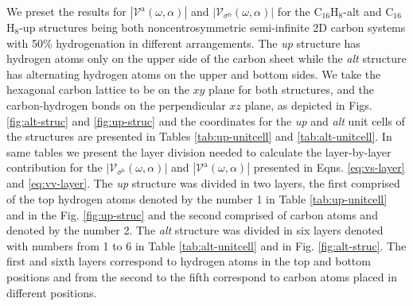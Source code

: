 \documentclass[prb,11pt,tightenlines,twocolumn,aps]{revtex4-1}
\begin{document}
We preset the results for $|\mathcal{V}^{\mathrm{a}}(\omega,\alpha)|$ and
$|\mathcal{V}_{\sigma^{\mathrm{b}}}(\omega,\alpha)|$ for the C$_{16}$H$_{8}$-alt
and C$_{16}$H$_{8}$-up structures being both noncentrosymmetric semi-infinite 2D
carbon systems with 50\% hydrogenation in different arrangements. The \emph{up}
structure has hydrogen atoms only on the upper side of the carbon sheet while
the \emph{alt} structure has alternating hydrogen atoms on the upper and bottom
sides. We take the hexagonal carbon lattice to be on the $xy$ plane for both
structures, and the carbon-hydrogen bonds on the perpendicular $xz$ plane, as
depicted in Figs. \ref{fig:alt-struc} and \ref{fig:up-struc}
% 
{\color{blue} and the coordinates for the \emph{up} and \emph{alt} unit cells of
the structures are presented in Tables \ref{tab:up-unitcell} and
% 
\ref{tab:alt-unitcell}. In same tables we present the layer division needed to
calculate the layer-by-layer contribution for the
$|\mathcal{V}_{\sigma^{\mathrm{b}}}(\omega,\alpha)|$ and
$|\mathcal{V}^{\mathrm{a}}(\omega,\alpha)|$ presented in Eqns. 
% 
\eqref{eq:vs-layer} and \eqref{eq:vv-layer}. The \emph{up} structure was divided
in two layers, the first comprised of the top hydrogen atoms denoted by the
number 1 in Table \ref{tab:up-unitcell} and in the Fig. \ref{fig:up-struc} and
the second comprised of carbon atoms and denoted by the number 2. The \emph{alt}
structure was divided in six layers denoted with numbers from 1 to 6 in Table
\ref{tab:alt-unitcell} and in Fig. \ref{fig:alt-struc}. The first and sixth
layers correspond to hydrogen atoms in the top and bottom positions and from the
second to the fifth correspond to carbon atoms placed in different positions.}
\end{document}
